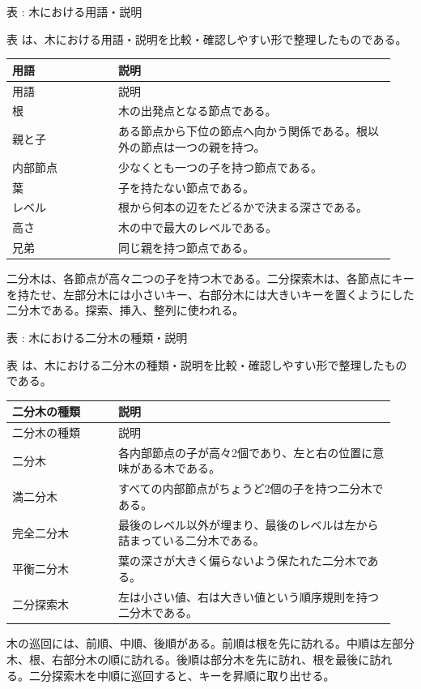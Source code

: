 \par\smallskip\noindent{}\label{tab:ch17-11}表 \thetable: 木における用語・説明\par\smallskip
表 \thetable は、木における用語・説明を比較・確認しやすい形で整理したものである。\par\smallskip
\begin{longtable}{>{\raggedright\arraybackslash}p{0.26\linewidth} >{\raggedright\arraybackslash}p{0.68\linewidth}}
\toprule
用語 & 説明 \\
\midrule
\endfirsthead
\toprule
用語 & 説明 \\
\midrule
\endhead
根 & 木の出発点となる節点である。 \\
親と子 & ある節点から下位の節点へ向かう関係である。根以外の節点は一つの親を持つ。 \\
内部節点 & 少なくとも一つの子を持つ節点である。 \\
葉 & 子を持たない節点である。 \\
レベル & 根から何本の辺をたどるかで決まる深さである。 \\
高さ & 木の中で最大のレベルである。 \\
兄弟 & 同じ親を持つ節点である。 \\
\bottomrule
\end{longtable}
二分木は、各節点が高々二つの子を持つ木である。二分探索木は、各節点にキーを持たせ、左部分木には小さいキー、右部分木には大きいキーを置くようにした二分木である。探索、挿入、整列に使われる。

\par\smallskip\noindent{}\label{tab:ch17-12}表 \thetable: 木における二分木の種類・説明\par\smallskip
表 \thetable は、木における二分木の種類・説明を比較・確認しやすい形で整理したものである。\par\smallskip
\begin{longtable}{>{\raggedright\arraybackslash}p{0.26\linewidth} >{\raggedright\arraybackslash}p{0.68\linewidth}}
\toprule
二分木の種類 & 説明 \\
\midrule
\endfirsthead
\toprule
二分木の種類 & 説明 \\
\midrule
\endhead
二分木 & 各内部節点の子が高々2個であり、左と右の位置に意味がある木である。 \\
満二分木 & すべての内部節点がちょうど2個の子を持つ二分木である。 \\
完全二分木 & 最後のレベル以外が埋まり、最後のレベルは左から詰まっている二分木である。 \\
平衡二分木 & 葉の深さが大きく偏らないよう保たれた二分木である。 \\
二分探索木 & 左は小さい値、右は大きい値という順序規則を持つ二分木である。 \\
\bottomrule
\end{longtable}
木の巡回には、前順、中順、後順がある。前順は根を先に訪れる。中順は左部分木、根、右部分木の順に訪れる。後順は部分木を先に訪れ、根を最後に訪れる。二分探索木を中順に巡回すると、キーを昇順に取り出せる。


